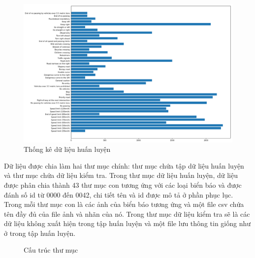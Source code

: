 \begin{figure}[H]
\begin{center}
\includegraphics[scale=0.3]{chap5/image/data_statistic_ori.png}
\caption{Thống kê dữ liệu huấn luyện}
\label{fig:data_statistic}
\end{center}
\end{figure}
Dữ liệu được chia làm hai thư mục chính: thư mục chứa tập dữ liệu huấn luyện và thư mục chứa dữ liệu kiểm tra. Trong thư mục dữ liệu huấn luyện, dữ liệu được phân chia thành 43 thư mục con tương ứng với các loại biển báo và được đánh số id từ 0000 đến 0042, chi tiết tên và id được mô tả ở phần phục lục. Trong mỗi thư mục con là các ảnh của biển báo tương ứng và một file csv chứa tên đầy đủ của file ảnh và nhãn của nó. Trong thư mục dữ liệu kiểm tra sẽ là các dữ liệu không xuất hiện trong tập huấn luyện và một file lưu thông tin giống như ở trong tập huấn luyện.
\begin{figure}[H]
\begin{center}
\hspace{0.3cm}
\caption{Cấu trúc thư mục}
\end{center}
\end{figure}
